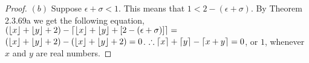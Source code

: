 \documentclass[a4paper, 12pt]{article}
\theoremstyle{plain}
\DeclarePairedDelimiter{\floor}{\lfloor}{\rfloor}
\DeclarePairedDelimiter{\ceil}{\lceil}{\rceil}
\begin{document}
\begin{proof}
		\newline
		\newline
		\indent $(b)$ Suppose $\epsilon + \sigma < 1$. This means that $1 < 2 - (\epsilon + \sigma)$. 
		By \newline \indent Theorem 2.3.69a we get the following equation, \newline \indent 
		$(\floor{x} + \floor{y} + 2) - \ceil{\floor{x} + \floor{y} + [2 - (\epsilon + \sigma)]} =$ 
		\newline \indent $(\floor{x} + \floor{y} + 2) - (\floor{x} + \floor{y} + 2) = 0$.
		\newline
		\newline
		$\therefore \ceil{x} + \ceil{y} - \ceil{x + y} = 0$, or $1$, whenever $x$ and $y$ are real 
		numbers.
	\end{proof}
\end{document}
